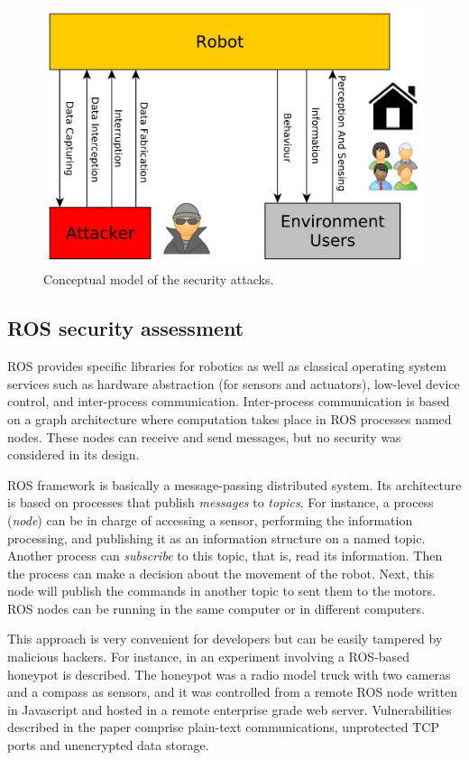 \documentclass[journal,twoside]{JoPhA}
\begin{document}
\begin{figure}[ht]
    \centering
    \includegraphics[width=.5\textwidth]{RobotsAttacks.pdf}
    \caption{Conceptual model of the security attacks.}
  \label{fig:Conceptualmodel}
\end{figure}


\subsection{ROS security assessment}

ROS provides specific libraries for robotics as well as classical operating system services such as hardware abstraction (for sensors and actuators), low-level device control, and inter-process communication. Inter-process communication is based on a graph architecture where computation takes place in ROS processes named nodes. These nodes can receive and send messages, but no security was considered in its design. 

ROS framework is basically a message-passing distributed system. Its architecture is based on processes that publish {\em messages} to {\em topics}. For instance, a process ({\em node}) can be in charge of accessing a sensor, performing the information processing, and publishing it as an information structure on a named topic. Another process can {\em subscribe} to this topic, that is, read its information. Then the process can make a decision about the movement of the robot. Next, this node will publish the commands in another topic to sent them to the motors. ROS nodes can be running in the same computer or in different computers.

This approach is very convenient for developers but can be easily tampered by malicious hackers. For instance, in \cite{McClean2013} an experiment involving a ROS-based honeypot is described. The honeypot was a radio model truck with two cameras and a compass as sensors, and it was controlled from a remote ROS node written in Javascript and hosted in a remote enterprise grade web server. Vulnerabilities described in the paper comprise plain-text communications, unprotected TCP ports and unencrypted data storage.
\end{document}
